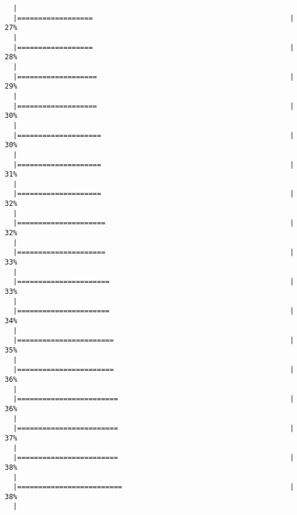 \begin{knitrout}
\begin{kframe}
\begin{verbatim}
  |                                                                       
  |==================                                               |  27%
  |                                                                       
  |==================                                               |  28%
  |                                                                       
  |===================                                              |  29%
  |                                                                       
  |===================                                              |  30%
  |                                                                       
  |====================                                             |  30%
  |                                                                       
  |====================                                             |  31%
  |                                                                       
  |====================                                             |  32%
  |                                                                       
  |=====================                                            |  32%
  |                                                                       
  |=====================                                            |  33%
  |                                                                       
  |======================                                           |  33%
  |                                                                       
  |======================                                           |  34%
  |                                                                       
  |=======================                                          |  35%
  |                                                                       
  |=======================                                          |  36%
  |                                                                       
  |========================                                         |  36%
  |                                                                       
  |========================                                         |  37%
  |                                                                       
  |========================                                         |  38%
  |                                                                       
  |=========================                                        |  38%
  |                                                                       

\end{verbatim}
\end{kframe}
\end{knitrout}
